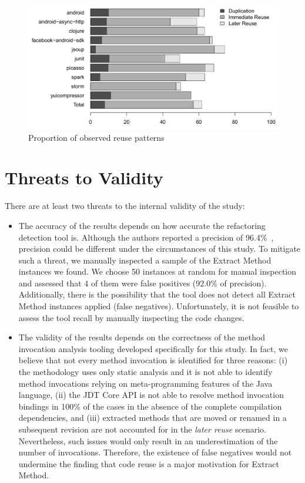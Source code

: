 \begin{figure}[htbp]\centering
\includegraphics[width=1\textwidth]{img/ch5/barchart2.pdf}
\caption{Proportion of observed reuse patterns}
\label{ireuse}
\end{figure}


\section{Threats to Validity}
\label{sameacas}

There are at least two threats to the internal validity of the study:
\begin{itemize}
\item The accuracy of the results depends on how accurate the refactoring detection tool is. Although the authors reported a precision of  96.4\%~\citep{tsantalis_empiricalstudy}, precision could be different under the circumstances of this study.
To mitigate such a threat, we manually inspected a sample of the Extract Method instances we found. We choose 50 instances at random for manual inspection and assessed that 4 of them were false positives (92.0\% of precision).
Additionally, there is the possibility that the tool does not detect all Extract Method instances applied (false negatives). Unfortunately, it is not feasible to assess the tool recall by manually inspecting the code changes.

\item The validity of the results depends on the correctness of the method invocation analysis tooling developed specifically for this study. In fact, we believe that not every method invocation is identified for three reasons: (i) the methodology uses only static analysis and it is not able to identify method invocations relying on meta-programming features of the Java language, (ii) the JDT Core API is not able to resolve method invocation bindings in 100\% of the cases in the absence of the complete compilation dependencies, and (iii) extracted methods that are moved or renamed in a subsequent revision are not accounted for in the \emph{later reuse} scenario.
Nevertheless, such issues would only result in an underestimation of the number of invocations. Therefore, the existence of false negatives would not undermine the finding that code reuse is a major motivation for Extract Method.
\end{itemize}

